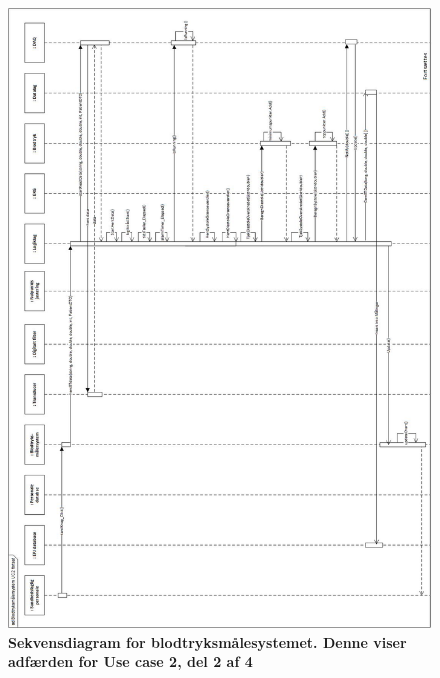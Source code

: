 \begin{figure}[H]
\includegraphics[width =1.0\textwidth , center]{billeder/sdUC2_2}
\caption{\textbf{Sekvensdiagram for blodtryksmålesystemet. Denne viser adfærden for Use case 2, del 2 af 4}}
\end{figure}
